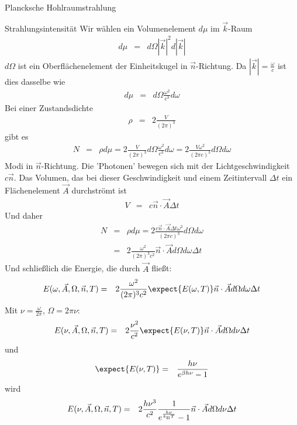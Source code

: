 \begin{chapter}{\titlestr}
\begin{section}{Plancksche Hohlraumstrahlung}
\begin{subsection}{Strahlungsintensität}
Wir wählen ein Volumenelement $d\mu$ im $\vec{k}$-Raum
\begin{eqnarray*}
d\mu &=& d\Omega |\vec{k}|^2d|\vec{k}|
\end{eqnarray*}
$d\Omega$ ist ein Oberflächenelement der Einheitskugel in $\vec{n}$-Richtung. Da $|\vec{k}|=\frac{\omega}{c}$ ist dies dasselbe wie
\begin{eqnarray*}
d\mu &=& d\Omega \frac{\omega^2}{c^3}d\omega
\end{eqnarray*}
Bei einer Zustandsdichte
\begin{eqnarray*}
\rho &=& 2\frac{V}{(2\pi)^3}
\end{eqnarray*}
gibt es
\begin{eqnarray*}
N &=& \rho d\mu = 2\frac{V}{(2\pi)^3}d\Omega \frac{\omega^2}{c^3}d\omega
=2\frac{V\omega^2}{(2\pi c)^3}d\Omega d\omega
\end{eqnarray*}
Modi in $\vec{n}$-Richtung. Die 'Photonen' bewegen sich mit der Lichtgeschwindigkeit $c\vec{n}$. Das Volumen, das bei dieser Geschwindigkeit und einem Zeitintervall $\Delta t$ ein Flächenelement $\vec{A}$ durchströmt ist
\begin{eqnarray*}
V &=& c\vec{n}\cdot\vec{A}\Delta t
\end{eqnarray*}
Und daher
\begin{eqnarray*}
N &=& \rho d\mu = 2\frac{c\vec{n}\cdot\vec{A}\Delta t\omega^2}{(2\pi c)^3}d\Omega d\omega\\
&=& 2\frac{\omega^2}{(2\pi )^3c^2}\vec{n}\cdot\vec{A}d\Omega d\omega\Delta t
\end{eqnarray*}
Und schließlich die Energie, die durch $\vec{A}$ fließt:
\begin{eqnarray*}
E(\omega,\vec{A},\Omega,\vec{n},T) &=& 2\frac{\omega^2}{(2\pi )^3c^2}\expect{E(\omega,T)}\vec{n}\cdot\vec{A}d\Omega d\omega\Delta t
\end{eqnarray*}
Mit $\nu=\frac{\omega}{2\pi}$, $\Omega=2\pi\nu$:
\begin{eqnarray*}
E(\nu,\vec{A},\Omega,\vec{n},T) &=& 2\frac{\nu^2}{c^2}\expect{E(\nu,T)}\vec{n}\cdot\vec{A}d\Omega d\nu\Delta t\\
\end{eqnarray*}
und
\begin{eqnarray*}
\expect{E(\nu,T)} &=& \frac{h\nu}{e^{\beta h\nu}-1}
\end{eqnarray*}
wird
\begin{eqnarray*}
E(\nu,\vec{A},\Omega,\vec{n},T) &=& 2\frac{h\nu^3}{c^2}\frac{1}{e^\frac{h\nu}{\kb T}-1}\vec{n}\cdot\vec{A}d\Omega d\nu\Delta t\\

\end{eqnarray*}
\end{subsection}
\end{section}
\end{chapter}

